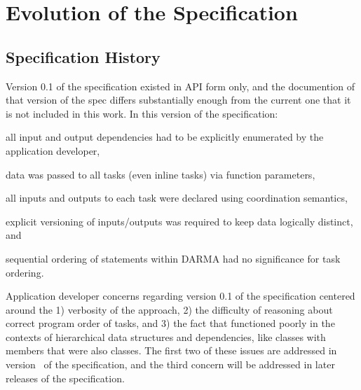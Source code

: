 
\chapter{Evolution of the Specification}
\label{chap:evolution}
\section{Specification History}
\label{sec:past}
Version 0.1 of the specification existed in \gls{API} form only, and
the documention of that version of the spec differs substantially
enough from the current one that it is not included in this work.
In this version of the specification:
\begin{compactenum}
\item all input and output dependencies had to be explicitly enumerated by the application
developer,
\item data was passed to all tasks (even inline tasks) via function parameters,
\item all inputs and outputs to each task were declared using \gls{coordination semantics},
\item explicit versioning of inputs/outputs was required to keep data
logically distinct, and
\item sequential ordering of statements within DARMA had no significance for task ordering.
\end{compactenum}

 Application developer concerns regarding version 0.1 of the specification
 centered around the 1) verbosity of the approach, 2) the difficulty of
 reasoning about correct program order of tasks, and 3) the fact that 
  functioned poorly in the contexts of hierarchical data
 structures and dependencies, like classes with members that were also
 classes.  The first two of these issues are addressed in version \specVersion\ of the
 specification, and the third concern will be addressed in later releases of the specification.
   


